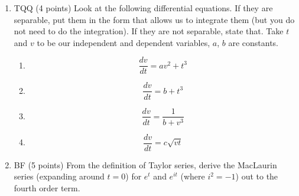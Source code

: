 \documentclass[12pt]{article}
\begin{document}
\begin{enumerate}
\begin{enumerate}
  \end{enumerate}





  \clearpage
  \item	TQQ (4 points) Look at the following differential equations.  If they are separable, put them in the form that allows us to integrate them (but you do not need to do the integration).  If they are not separable, state that.  Take $t$ and $v$ to be our independent and dependent variables, $a$, $b$  are constants.
  \begin{enumerate}
    \item $$\frac{dv}{dt} = av^2 + t^3$$
    \item $$\frac{dv}{dt} = b + t^3$$
    \item $$\frac{dv}{dt} = \frac{1}{b + v^3}$$
    \item $$\frac{dv}{dt} = c\sqrt{vt}$$
  \end{enumerate}


\item BF (5 points) From the definition of Taylor series, derive the MacLaurin series (expanding around $t=0$) for $e^t$  and $e^{it}$ (where $i^2=-1$) out to the fourth order term.



\end{enumerate}
\end{document}
